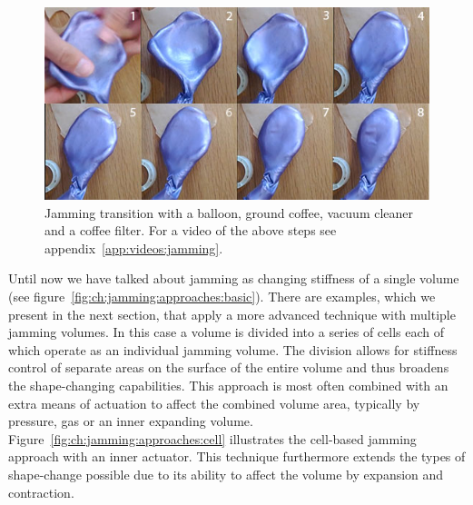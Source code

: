 \begin{figure}[h]
  \centering
  \includegraphics[width=.9\textwidth]{figures/jamming/jamming-transition}
  \caption[A jamming transition setup.]
  {Jamming transition with a balloon, ground coffee, vacuum cleaner and a coffee filter. For a video of the above steps see appendix~\ref{app:videos:jamming}.}
  \label{fig:ch:jamming:jamming-transition}
\end{figure}

Until now we have talked about jamming as changing stiffness of a single volume (see figure~\ref{fig:ch:jamming:approaches:basic}).
There are examples, which we present in the next section, that apply a more advanced technique with multiple jamming volumes.
In this case a volume is divided into a series of cells each of which operate as an individual jamming volume.
The division allows for stiffness control of separate areas on the surface of the entire volume and thus broadens the shape-changing capabilities.
This approach is most often combined with an extra means of actuation to affect the combined volume area, typically by pressure, gas or an inner expanding volume. 
Figure~\ref{fig:ch:jamming:approaches:cell} illustrates the cell-based jamming approach with an inner actuator.
This technique furthermore extends the types of shape-change possible due to its ability to affect the volume by expansion and contraction. 

